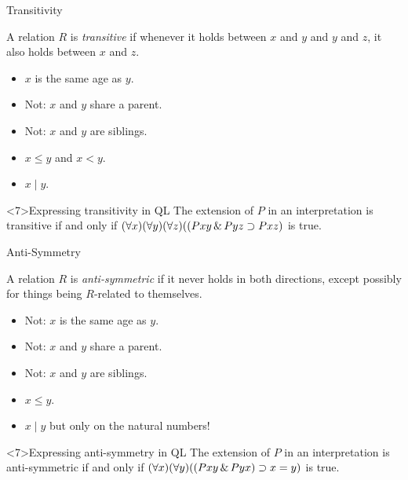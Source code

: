 \begin{frame}{Transitivity}
  \begin{definition}
    A relation $R$ is \emph{transitive} if whenever it holds between
    $x$ and $y$ and $y$ and $z$, it also holds between $x$ and $z$.
  \end{definition}
\pause
  \begin{itemize}[<+->]
    \item $x$ is the same age as $y$.
    \item Not: $x$ and $y$ share a parent.
    \item Not: $x$ and $y$ are siblings.
    \item $x \le y$ and $x < y$.
    \item $x \mid y$.
  \end{itemize}

  \begin{block}<7>{Expressing transitivity in QL}
    The extension of $P$ in an interpretation is transitive
    if and only if $(\forall x)(\forall y)(\forall z)((Pxy \,\&\, Pyz \supset Pxz)$ is true.
  \end{block}
\end{frame}

\begin{frame}{Anti-Symmetry}
  \begin{definition}
    A relation $R$ is \emph{anti-symmetric} if it never holds in both
    directions, except possibly for things being $R$-related to themselves.
  \end{definition}
\pause
  \begin{itemize}[<+->]
    \item Not: $x$ is the same age as $y$.
    \item Not: $x$ and $y$ share a parent.
    \item Not: $x$ and $y$ are siblings.
    \item $x \le y$.
    \item $x \mid y$ but only on the natural numbers!
  \end{itemize}

  \begin{block}<7>{Expressing anti-symmetry in QL}
    The extension of $P$ in an interpretation is anti-symmetric
    if and only if $(\forall x)(\forall y)((Pxy \,\&\, Pyx) \supset x=y)$ is true.
  \end{block}
\end{frame}

